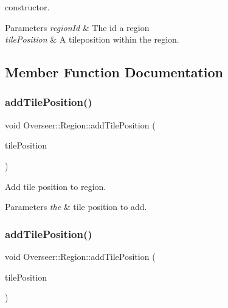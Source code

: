 constructor. 


\begin{DoxyParams}{Parameters}
{\em region\+Id} & The id a region \\
\hline
{\em tile\+Position} & A tileposition within the region. \\
\hline
\end{DoxyParams}


\subsection{Member Function Documentation}
\mbox{\label{classOverseer_1_1Region_aacbbc5db08289919979c40638b90ff7f}} 
\subsubsection{\texorpdfstring{add\+Tile\+Position()}{addTilePosition()}\hspace{0.1cm}{\footnotesize\ttfamily [1/2]}}
{\footnotesize\ttfamily void Overseer\+::\+Region\+::add\+Tile\+Position (\begin{DoxyParamCaption}\item[{std\+::shared\+\_\+ptr$<$ Tile\+Position $>$}]{tile\+Position }\end{DoxyParamCaption})}



Add tile position to region. 


\begin{DoxyParams}{Parameters}
{\em the} & tile position to add. \\
\hline
\end{DoxyParams}
\mbox{\label{classOverseer_1_1Region_a95f03d39e96fdb038bfa8d55c3609896}} 
\subsubsection{\texorpdfstring{add\+Tile\+Position()}{addTilePosition()}\hspace{0.1cm}{\footnotesize\ttfamily [2/2]}}
{\footnotesize\ttfamily void Overseer\+::\+Region\+::add\+Tile\+Position (\begin{DoxyParamCaption}\item[{Tile\+Position \&}]{tile\+Position }\end{DoxyParamCaption})}



